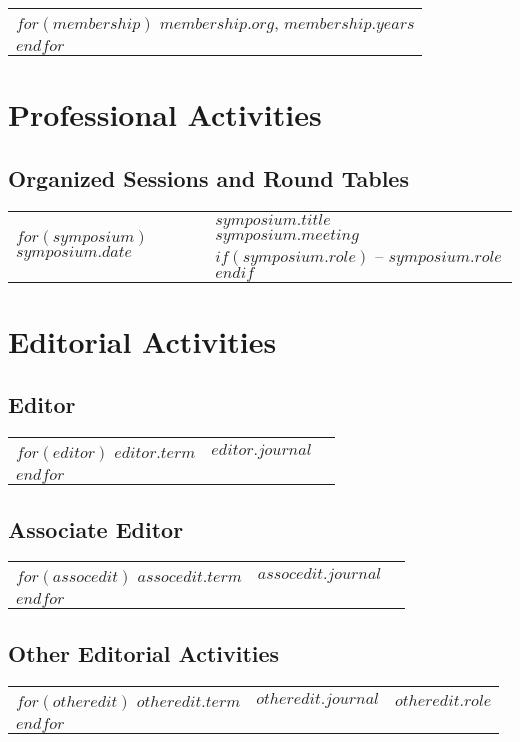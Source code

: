 \documentclass[martgin, line]{article}
\begin{document}
\begin{tabular}{l}
$for(membership)$
$membership.org$, $membership.years$\\
$endfor$
\end{tabular}



\section*{Professional Activities}



\subsection*{Organized Sessions and Round Tables}
\setlength{\extrarowheight}{.75em}
\begin{tabular}{lp{5.5in}}   
$for(symposium)$
$symposium.date$&
\parbox[t]{5.5in}{
    $symposium.title$\\
  \textit{$symposium.meeting$}
  $if(symposium.role)$ -- $symposium.role$$endif$ 
  }\\
$endfor$
\end{tabular}
\setlength{\extrarowheight}{0em}


\section*{Editorial Activities}

\subsection*{Editor}
\begin{tabular}{lll}
$for(editor)$
$editor.term$&
$editor.journal$
\\
$endfor$
\end{tabular}


\subsection*{Associate Editor}
\begin{tabular}{lll}
$for(assocedit)$
$assocedit.term$&
$assocedit.journal$
\\
$endfor$
\end{tabular}

\subsection*{Other Editorial Activities}
\begin{tabular}{lll}
$for(otheredit)$
$otheredit.term$&
$otheredit.journal$&
$otheredit.role$
\\
$endfor$
\end{tabular}
\end{document}
